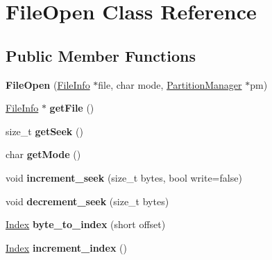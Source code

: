 \hypertarget{classFileOpen}{}\section{File\+Open Class Reference}
\label{classFileOpen}
\subsection*{Public Member Functions}
\begin{DoxyCompactItemize}
\item 
\mbox{\label{classFileOpen_a387c8980a812856a3633ff162c1c1af4}} 
{\bfseries File\+Open} (\mbox{\hyperlink{classFileInfo}{File\+Info}} $\ast$file, char mode, \mbox{\hyperlink{classPartitionManager}{Partition\+Manager}} $\ast$pm)
\item 
\mbox{\label{classFileOpen_a811022e6d3aeb87197f606f96ea48b4d}} 
\mbox{\hyperlink{classFileInfo}{File\+Info}} $\ast$ {\bfseries get\+File} ()
\item 
\mbox{\label{classFileOpen_a04e80a75040ac13609bbc05854ba4627}} 
size\+\_\+t {\bfseries get\+Seek} ()
\item 
\mbox{\label{classFileOpen_a2e0be6fcbcabe3b84c494aa3686d0a53}} 
char {\bfseries get\+Mode} ()
\item 
\mbox{\label{classFileOpen_a8b178b10d2081d8c64a1218f11b9265a}} 
void {\bfseries increment\+\_\+seek} (size\+\_\+t bytes, bool write=false)
\item 
\mbox{\label{classFileOpen_a7e1fd46a093bef3a650e1d1e4d431cf7}} 
void {\bfseries decrement\+\_\+seek} (size\+\_\+t bytes)
\item 
\mbox{\label{classFileOpen_a6d1374e052e3d9ba190e2797d9ae06a0}} 
\mbox{\hyperlink{structindex}{Index}} {\bfseries byte\+\_\+to\+\_\+index} (short offset)
\item 
\mbox{\label{classFileOpen_abd29158f55f135ada0c5a0f25ee5ace6}} 
\mbox{\hyperlink{structindex}{Index}} {\bfseries increment\+\_\+index} ()
\item 
\mbox{\label{classFileOpen_a1523bffc4bc58984b53b309eb92cc8b9}} 

\end{DoxyCompactItemize}
